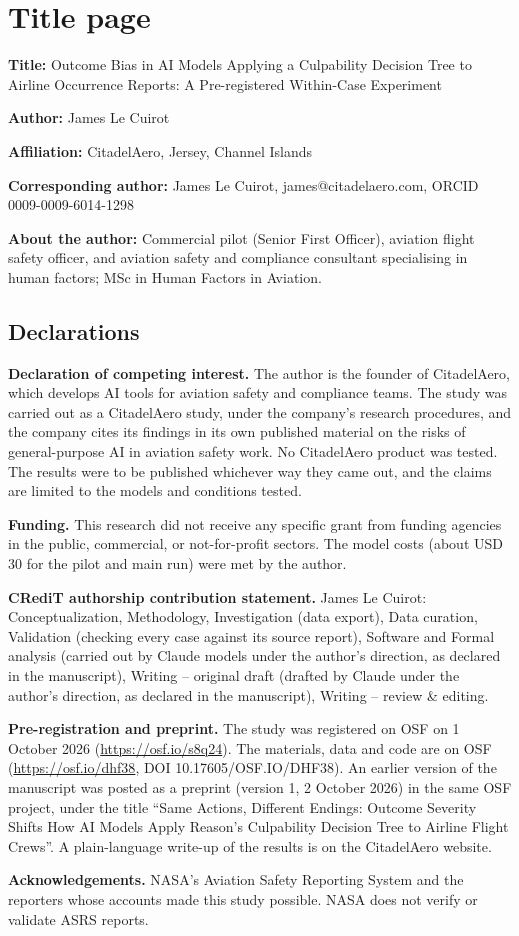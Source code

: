 \documentclass[12pt]{article}
\begin{document}
\section*{Title page}

\textbf{Title:} Outcome Bias in AI Models Applying a Culpability Decision Tree to Airline Occurrence Reports: A Pre-registered Within-Case Experiment

\textbf{Author:} James Le Cuirot

\textbf{Affiliation:} CitadelAero, Jersey, Channel Islands

\textbf{Corresponding author:} James Le Cuirot, james@citadelaero.com, ORCID 0009-0009-6014-1298

\textbf{About the author:} Commercial pilot (Senior First Officer), aviation flight safety officer, and aviation safety and compliance consultant specialising in human factors; MSc in Human Factors in Aviation.

\subsection*{Declarations}

\textbf{Declaration of competing interest.} The author is the founder of CitadelAero, which develops AI tools for aviation safety and compliance teams. The study was carried out as a CitadelAero study, under the company's research procedures, and the company cites its findings in its own published material on the risks of general-purpose AI in aviation safety work. No CitadelAero product was tested. The results were to be published whichever way they came out, and the claims are limited to the models and conditions tested.

\textbf{Funding.} This research did not receive any specific grant from funding agencies in the public, commercial, or not-for-profit sectors. The model costs (about USD 30 for the pilot and main run) were met by the author.

\textbf{CRediT authorship contribution statement.} James Le Cuirot: Conceptualization, Methodology, Investigation (data export), Data curation, Validation (checking every case against its source report), Software and Formal analysis (carried out by Claude models under the author's direction, as declared in the manuscript), Writing -- original draft (drafted by Claude under the author's direction, as declared in the manuscript), Writing -- review \& editing.

\textbf{Pre-registration and preprint.} The study was registered on OSF on 1 October 2026 (\url{https://osf.io/s8q24}). The materials, data and code are on OSF (\url{https://osf.io/dhf38}, DOI 10.17605/OSF.IO/DHF38). An earlier version of the manuscript was posted as a preprint (version 1, 2 October 2026) in the same OSF project, under the title ``Same Actions, Different Endings: Outcome Severity Shifts How AI Models Apply Reason's Culpability Decision Tree to Airline Flight Crews''. A plain-language write-up of the results is on the CitadelAero website.

\textbf{Acknowledgements.} NASA's Aviation Safety Reporting System and the reporters whose accounts made this study possible. NASA does not verify or validate ASRS reports.
\end{document}
